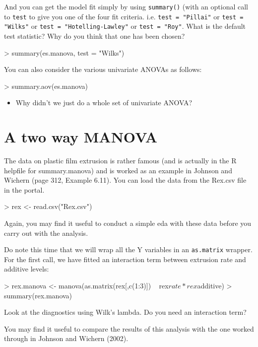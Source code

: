 \documentclass[11pt]{article}
\begin{document}
And you can get the model fit simply by using \texttt{summary()} (with an optional call to \texttt{test} to give you one of the four fit criteria. i.e. \texttt{test = "Pillai"} or \texttt{test = "Wilks"} or \texttt{test = "Hotelling-Lawley"} or \texttt{test = "Roy"}.   What is the default test statistic?   Why do you think that one has been chosen?

\begin{Schunk}
\begin{Sinput}
> summary(es.manova, test = "Wilks")
\end{Sinput}
\end{Schunk}

You can also consider the various univariate ANOVAs as follows:

\begin{Schunk}
\begin{Sinput}
> summary.aov(es.manova)
\end{Sinput}
\end{Schunk}

\begin{itemize}
\item Why didn't we just do a whole set of univariate ANOVA?
\end{itemize}

\section{A two way MANOVA}

The data on plastic film extrusion is rather famous (and is actually in the R helpfile for summary.manova) and is worked as an example in Johnson and Wichern (page 312, Example 6.11).  You can load the data from the Rex.csv file in the portal.

\begin{Schunk}
\begin{Sinput}
> rex <- read.csv("Rex.csv")
\end{Sinput}
\end{Schunk}

Again, you may find it useful to conduct a simple eda with these data before you carry out with the analysis.

Do note this time that we will wrap all the Y variables in an \texttt{as.matrix} wrapper.   For the first call, we have fitted an interaction term between extrusion rate and additive levels:

\begin{Schunk}
\begin{Sinput}
> rex.manova <- manova(as.matrix(rex[,c(1:3)]) ~ rex$rate*rex$additive)
> summary(rex.manova)
\end{Sinput}
\end{Schunk}

Look at the diagnostics using Wilk's lambda.   Do you need an interaction term?

You may find it useful to compare the results of this analysis with the one worked through in Johnson and Wichern (2002).
\end{document}
